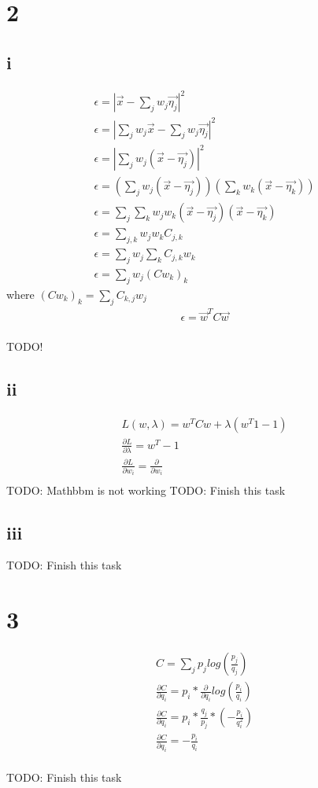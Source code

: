 \documentclass[11pt,a4paper]{article}
\begin{document}
\section*{2}

\subsection*{i}

\begin{gather*}
\epsilon = |\vec{x}  - \sum_j w_j \vec{\eta_j}|^2 \\
\epsilon = |\sum_j w_j \vec{x} -  \sum_j w_j \vec{\eta_j}|^2 \\
\epsilon = |\sum_j w_j (\vec{x} - \vec{\eta_j})|^2 \\
\epsilon = (\sum_j w_j (\vec{x} - \vec{\eta_j})) (\sum_k w_k (\vec{x} - \vec{\eta_k})) \\
\epsilon = \sum_j \sum_k w_j w_k  (\vec{x} - \vec{\eta_j}) (\vec{x} - \vec{\eta_k}) \\
\epsilon = \sum_{j,k} w_j w_k C_{j,k} \\
\epsilon = \sum_j w_j \sum_k C_{j,k} w_k \\
\epsilon = \sum_j w_j (C w_k)_k 
\end{gather*}
where $(C w_k)_k = \sum_j C_{k,j} w_j$
\begin{gather*}
\epsilon = \vec{w}^TC\vec{w} \\
\end{gather*}

TODO!

\subsection*{ii}

\begin{gather*}
L(w,\lambda) = w^T Cw + \lambda(w^T 1 - 1) \\
\frac{\partial L}{\partial \lambda} = w^T  -1 \\
\frac{\partial L}{\partial w_i} = \frac{\partial}{\partial w_i} \\
\end{gather*}
TODO: Mathbbm is not working
TODO: Finish this task
\subsection*{iii}

TODO: Finish this task

\section*{3}

\begin{gather*}
C = \sum_j p_j log(\frac{p_j}{q_j}) \\
\frac{\partial C}{\partial q_i} = p_i * \frac{\partial}{\partial q_i} log(\frac{p_i}{q_i}) \\
\frac{\partial C}{\partial q_i} = p_i * \frac{q_j}{p_j} * (-\frac{p_i}{q_i^2}) \\
\frac{\partial C}{\partial q_i} = -\frac{p_i}{q_i} \\
\end{gather*}



TODO: Finish this task
\end{document}
